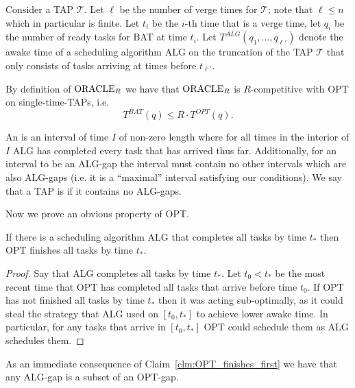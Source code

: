 Consider a TAP $\mathcal{T}$. Let $\ell$ be the number of verge
times for $\mathcal{T}$; note that $\ell \le n$ which in
particular is finite. Let $t_i$ be the $i$-th time that is a
verge time, let $q_i$ be the number of ready tasks for BAT at
time $t_i$. Let $T^{ALG}(q_1, \ldots, q_{\ell'})$ denote the
awake time of a scheduling algorithm ALG on the truncation of the
TAP $\mathcal{T}$ that only consists of tasks arriving at times
before $t_{\ell'}$.

By definition of $\operatorname{\text{ORACLE}}_R$ we have that $\operatorname{\text{ORACLE}}_R$ is
$R$-competitive with OPT on single-time-TAPs, i.e.
\begin{equation}
  \label{eq:same_single}
  T^{BAT}(q) \le R \cdot T^{OPT}(q).
\end{equation}

An  is an interval of time $I$ of non-zero length where for
all times in the interior of $I$ ALG has completed every
task that has arrived thus far. Additionally, for an interval to
be an ALG-gap the interval must contain no other intervals which
are also ALG-gaps (i.e. it is a \enquote{maximal} interval
satisfying our conditions).
We say that a TAP is  if it contains no ALG-gaps.

Now we prove an obvious property of OPT.
\begin{claim}
  \label{clm:OPT_finishes_first}
  If there is a scheduling algorithm ALG that completes all tasks by
  time $t_*$ then OPT finishes all tasks by time $t_*$.
\end{claim}
\begin{proof}
  Say that ALG completes all tasks by time $t_*$. Let $t_0 < t_*$
  be the most recent time that OPT has completed all tasks that
  arrive before time $t_0$. If OPT has not finished all tasks by
  time $t_*$ then it was acting sub-optimally, as it could steal
  the strategy that ALG used on $[t_0, t_*]$ to achieve lower
  awake time. In particular, for any tasks that arrive in $[t_0,
  t_*]$ OPT could schedule them as ALG schedules them. 
\end{proof}
As an immediate consequence of Claim~\ref{clm:OPT_finishes_first}
we have that any ALG-gap is a subset of an OPT-gap.

